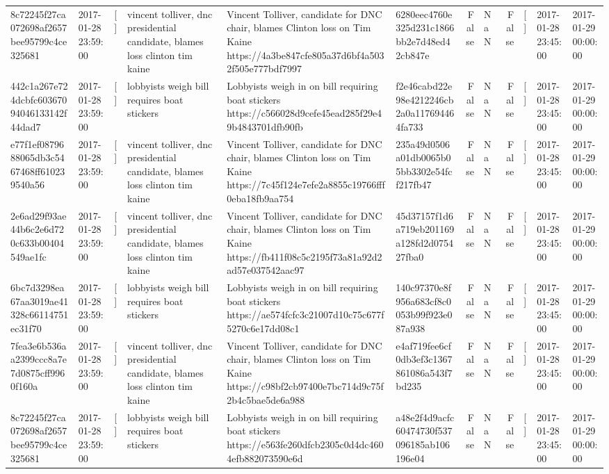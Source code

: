 \begin{tabular}{llllllrlrlll}
8c72245f27ca072698af2657bee95799c4ce325681 & 2017-01-28 23:59:00 & [] & vincent tolliver, dnc presidential candidate, blames loss clinton tim kaine & Vincent Tolliver, candidate for DNC chair, blames Clinton loss on Tim Kaine https://4a3be847cfe805a37d6bf4a5032f505e777bdf7997 & 6280eec4760e325d231c1866bb2e7d48ed42cb847e & False & NaN & False & [] & 2017-01-28 23:45:00 & 2017-01-29 00:00:00 \\
442c1a267e724dcbfc60367094046133142f44dad7 & 2017-01-28 23:59:00 & [] & lobbyists weigh bill requires boat stickers & Lobbyists weigh in on bill requiring boat stickers https://c566028d9cefe45ead285f29e49b4843701dfb90fb & f2e46cabd22e98e4212246cb2a0a117694464fa733 & False & NaN & False & [] & 2017-01-28 23:45:00 & 2017-01-29 00:00:00 \\
e77f1ef0879688065db3c5467468ff610239540a56 & 2017-01-28 23:59:00 & [] & vincent tolliver, dnc presidential candidate, blames loss clinton tim kaine & Vincent Tolliver, candidate for DNC chair, blames Clinton loss on Tim Kaine https://7c45f124e7efe2a8855c19766fff0eba18fb9aa754 & 235a49d0506a01db0065b05bb3302e54fcf217fb47 & False & NaN & False & [] & 2017-01-28 23:45:00 & 2017-01-29 00:00:00 \\
2e6ad29f93ae44b6c2e6d720c633b00404549ae1fc & 2017-01-28 23:59:00 & [] & vincent tolliver, dnc presidential candidate, blames loss clinton tim kaine & Vincent Tolliver, candidate for DNC chair, blames Clinton loss on Tim Kaine https://fb411f08c5c2195f73a81a92d2ad57e037542aac97 & 45d37157f1d6a719eb201169a128fd2d075427fba0 & False & NaN & False & [] & 2017-01-28 23:45:00 & 2017-01-29 00:00:00 \\
6bc7d3298ea67aa3019ae41328c66114751ec31f70 & 2017-01-28 23:59:00 & [] & lobbyists weigh bill requires boat stickers & Lobbyists weigh in on bill requiring boat stickers https://ae574fcfc3c21007d10c75c677f5270c6e17dd08c1 & 140c97370e8f956a683cf8c0053b99f923e087a938 & False & NaN & False & [] & 2017-01-28 23:45:00 & 2017-01-29 00:00:00 \\
7fea3e6b536aa2399ccc8a7e7d0875cff9960f160a & 2017-01-28 23:59:00 & [] & vincent tolliver, dnc presidential candidate, blames loss clinton tim kaine & Vincent Tolliver, candidate for DNC chair, blames Clinton loss on Tim Kaine https://c98bf2cb97400e7bc714d9c75f2b4c5bae5de6a988 & e4af719fee6cf0db3ef3c1367861086a543f7bd235 & False & NaN & False & [] & 2017-01-28 23:45:00 & 2017-01-29 00:00:00 \\
8c72245f27ca072698af2657bee95799c4ce325681 & 2017-01-28 23:59:00 & [] & lobbyists weigh bill requires boat stickers & Lobbyists weigh in on bill requiring boat stickers https://e563fe260dfcb2305c0d4dc4604efb882073590e6d & a48e2f4d9acfc60474730f537096185ab106196e04 & False & NaN & False & [] & 2017-01-28 23:45:00 & 2017-01-29 00:00:00 \\

\end{tabular}
